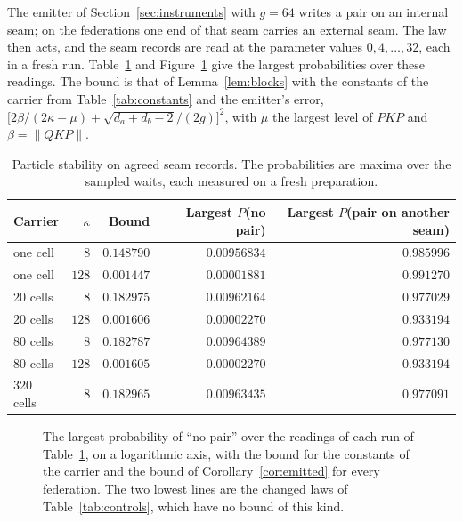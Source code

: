 \documentclass[11pt]{article}
\theoremstyle{definition}
\theoremstyle{remark}
\theoremstyle{plain}
\begin{document}
The emitter of Section~\ref{sec:instruments} with $g=64$ writes a pair on
an internal seam; on the federations one end of that seam carries an
external seam. The law then acts, and the seam records are read at the
parameter values $0,4,\dots,32$, each in a fresh run.
Table~\ref{tab:stability} and Figure~\ref{fig:stability} give the largest
probabilities over these readings. The bound is that of
Lemma~\ref{lem:blocks} with the constants of the carrier from
Table~\ref{tab:constants} and the emitter's error,
$\bigl[2\beta/(2\kappa-\mu)+\sqrt{d_a+d_b-2}/(2g)\bigr]^{2}$, with $\mu$
the largest level of $PKP$ and $\beta=\lVert QKP\rVert$.

\begin{table}[!htb]
\centering
\caption{Particle stability on agreed seam records. The probabilities are
maxima over the sampled waits, each measured on a fresh preparation.}
\label{tab:stability}
\begin{tabular}{@{}lrrrr@{}}
\toprule
Carrier & $\kappa$ & Bound & Largest $P$(no pair) & Largest $P$(pair on another seam) \\
\midrule
one cell & $8$ & $0.148790$ & $0.00956834$ & $0.985996$ \\
one cell & $128$ & $0.001447$ & $0.00001881$ & $0.991270$ \\
$20$ cells & $8$ & $0.182975$ & $0.00962164$ & $0.977029$ \\
$20$ cells & $128$ & $0.001606$ & $0.00002270$ & $0.933194$ \\
$80$ cells & $8$ & $0.182787$ & $0.00964389$ & $0.977130$ \\
$80$ cells & $128$ & $0.001605$ & $0.00002270$ & $0.933194$ \\
$320$ cells & $8$ & $0.182965$ & $0.00963435$ & $0.977091$ \\
\bottomrule
\end{tabular}
\end{table}

\begin{figure}[!htb]
\centering

\caption{The largest probability of ``no pair'' over the readings of each
run of Table~\ref{tab:stability}, on a logarithmic axis, with the bound for
the constants of the carrier and the bound of Corollary~\ref{cor:emitted}
for every federation. The two lowest lines are the changed laws of
Table~\ref{tab:controls}, which have no bound of this kind.}
\label{fig:stability}
\end{figure}
\end{document}
